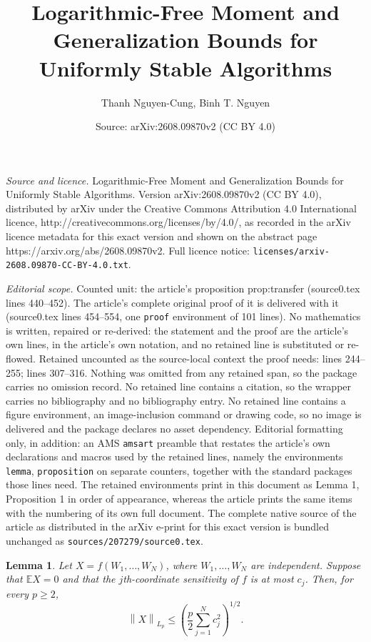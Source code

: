 \documentclass[10pt,a4paper]{amsart}
\title{Logarithmic-Free Moment and Generalization Bounds for Uniformly Stable Algorithms}
\author{Thanh Nguyen-Cung, Binh T. Nguyen}
\date{Source: arXiv:2608.09870v2 (CC BY 4.0)}
\newtheorem{lemma}{Lemma}
\newcommand{\E}{\mathbb{E}}
\newcommand{\norm}[1]{\left\lVert #1\right\rVert}
\begin{document}
\maketitle

\noindent\emph{Source and licence.} Logarithmic-Free Moment and Generalization Bounds for Uniformly Stable Algorithms. Version arXiv:2608.09870v2 (CC BY 4.0), distributed by arXiv under the Creative Commons Attribution 4.0 International licence, http://creativecommons.org/licenses/by/4.0/, as recorded in the arXiv licence metadata for this exact version and shown on the abstract page https://arxiv.org/abs/2608.09870v2. Full licence notice: \texttt{licenses/arxiv-2608.09870-CC-BY-4.0.txt}.\par\smallskip

\noindent\textit{Editorial scope.} Counted unit: the article's proposition prop:transfer (source0.tex lines 440--452). The article's complete original proof of it is delivered with it (source0.tex lines 454--554, one \texttt{proof} environment of 101 lines). No mathematics is written, repaired or re-derived: the statement and the proof are the article's own lines, in the article's own notation, and no retained line is substituted or re-flowed.  Retained uncounted as the source-local context the proof needs: lines 244--255; lines 307--316.  Nothing was omitted from any retained span, so the package carries no omission record.  No retained line contains a citation, so the wrapper carries no bibliography and no bibliography entry.  No retained line contains a figure environment, an image-inclusion command or drawing code, so no image is delivered and the package declares no asset dependency.  Editorial formatting only, in addition: an AMS \texttt{amsart} preamble that restates the article's own declarations and macros used by the retained lines, namely the environments \texttt{lemma}, \texttt{proposition} on separate counters, together with the standard packages those lines need.  The retained environments print in this document as Lemma 1, Proposition 1 in order of appearance, whereas the article prints the same items with the numbering of its own full document.  The complete native source of the article as distributed in the arXiv e-print for this exact version is bundled unchanged as \texttt{sources/207279/source0.tex}.
\begin{lemma}\label{lem:bd}
Let $X=f(W_1,\ldots,W_N)$, where $W_1,\ldots,W_N$ are independent.
Suppose that $\E X=0$ and that the $j$th-coordinate sensitivity of $f$ is
at most $c_j$. Then, for every $p\ge2$,
\[
\norm{X}_{L_p}
\le
\left(
\frac p2\sum_{j=1}^N c_j^2
\right)^{1/2}.
\]
\end{lemma}
\end{document}
